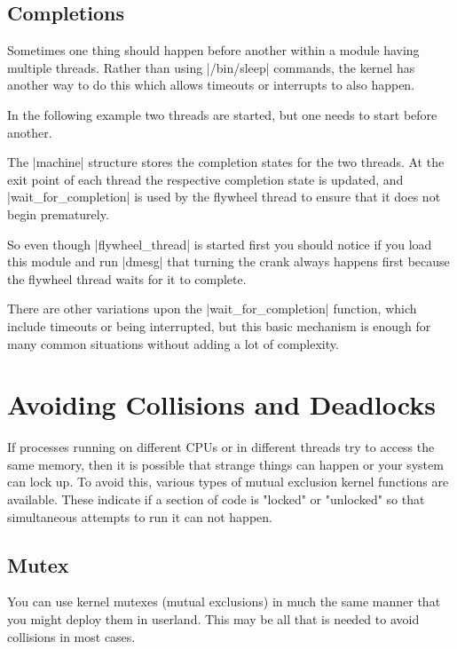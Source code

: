 \documentclass[10pt, oneside]{book}
\begin{document}


\subsection{Completions}
\label{sec:completion}
Sometimes one thing should happen before another within a module having multiple threads.
Rather than using \sh|/bin/sleep| commands, the kernel has another way to do this which allows timeouts or interrupts to also happen.

In the following example two threads are started, but one needs to start before another.


The \cpp|machine| structure stores the completion states for the two threads.
At the exit point of each thread the respective completion state is updated, and \cpp|wait_for_completion| is used by the flywheel thread to ensure that it does not begin prematurely.

So even though \cpp|flywheel_thread| is started first you should notice if you load this module and run \sh|dmesg| that turning the crank always happens first because the flywheel thread waits for it to complete.

There are other variations upon the \cpp|wait_for_completion| function, which include timeouts or being interrupted, but this basic mechanism is enough for many common situations without adding a lot of complexity.

\section{Avoiding Collisions and Deadlocks}
\label{sec:synchronization}
If processes running on different CPUs or in different threads try to access the same memory, then it is possible that strange things can happen or your system can lock up.
To avoid this, various types of mutual exclusion kernel functions are available.
These indicate if a section of code is "locked" or "unlocked" so that simultaneous attempts to run it can not happen.
\subsection{Mutex}
\label{sec:mutex}
You can use kernel mutexes (mutual exclusions) in much the same manner that you might deploy them in userland.
This may be all that is needed to avoid collisions in most cases.
\end{document}
